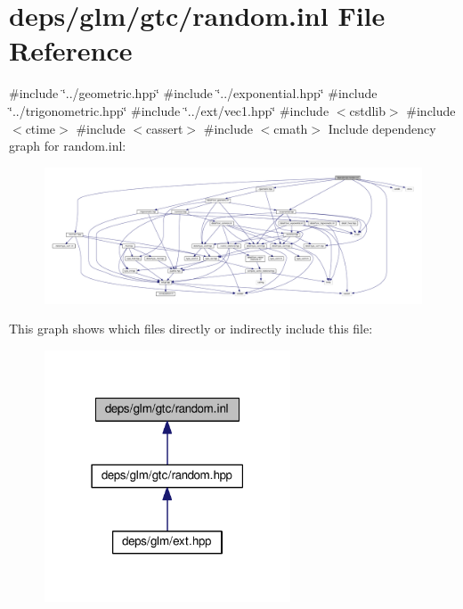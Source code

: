 \hypertarget{random_8inl}{}\section{deps/glm/gtc/random.inl File Reference}
\label{random_8inl}
{\ttfamily \#include \char`\"{}../geometric.\+hpp\char`\"{}}\newline
{\ttfamily \#include \char`\"{}../exponential.\+hpp\char`\"{}}\newline
{\ttfamily \#include \char`\"{}../trigonometric.\+hpp\char`\"{}}\newline
{\ttfamily \#include \char`\"{}../ext/vec1.\+hpp\char`\"{}}\newline
{\ttfamily \#include $<$cstdlib$>$}\newline
{\ttfamily \#include $<$ctime$>$}\newline
{\ttfamily \#include $<$cassert$>$}\newline
{\ttfamily \#include $<$cmath$>$}\newline
Include dependency graph for random.\+inl\+:
\nopagebreak
\begin{figure}[H]
\begin{center}
\leavevmode
\includegraphics[width=350pt]{d8/d2b/random_8inl__incl}
\end{center}
\end{figure}
This graph shows which files directly or indirectly include this file\+:
\nopagebreak
\begin{figure}[H]
\begin{center}
\leavevmode
\includegraphics[width=207pt]{da/df0/random_8inl__dep__incl}
\end{center}
\end{figure}
